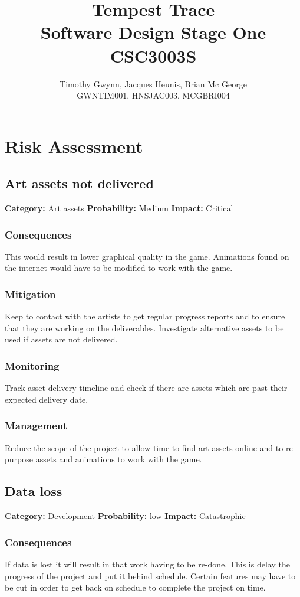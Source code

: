 \documentclass[a4paper,10pt]{article}
\title{Tempest Trace \\
Software Design Stage One
\\
CSC3003S}
\author{Timothy Gwynn, Jacques Heunis, Brian Mc George\\
GWNTIM001, HNSJAC003, MCGBRI004}
\begin{document}
\maketitle
\newpage
\tableofcontents
\newpage

\section{Risk Assessment}
\subsection{Art assets not delivered}
\textbf{Category:} Art assets\newline
\textbf{Probability:} Medium\newline
\textbf{Impact:} Critical
\subsubsection*{Consequences}
This would result in lower graphical quality in the game.
Animations found on the internet would have to be modified to work with the game.
\subsubsection*{Mitigation}
Keep to contact with the artists to get regular progress reports and to ensure that they are working on the deliverables. Investigate alternative assets to be used if assets are not delivered.
\subsubsection*{Monitoring}
Track asset delivery timeline and check if there are assets which are past their expected delivery date.
\subsubsection*{Management}
 Reduce the scope of the project to allow time to find art assets online and to re-purpose assets and animations to work with the game.

\subsection{Data loss}
\textbf{Category:} Development\newline
\textbf{Probability:} low\newline
\textbf{Impact:} Catastrophic
\subsubsection*{Consequences}
If data is lost it will result in that work having to be re-done. This is delay the progress of the project and put it behind schedule. Certain features may have to be cut in order to get back on schedule to complete the project on time.
\end{document}
